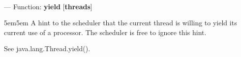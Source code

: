 \paragraph{}
\label{THREADS:YIELD}
--- Function: \textbf{yield} [\textbf{threads}] \textit{}

\begin{adjustwidth}{5em}{5em}
A hint to the scheduler that the current thread is willing to yield its current use of a processor. The scheduler is free to ignore this hint. 

See java.lang.Thread.yield().
\end{adjustwidth}

